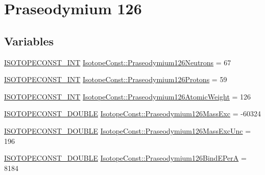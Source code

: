 \hypertarget{group___isotope_const-_praseodymium-_pr126}{}\section{Praseodymium 126}
\label{group___isotope_const-_praseodymium-_pr126}
\subsection*{Variables}
\begin{DoxyCompactItemize}
\item 
\mbox{\hyperlink{group___isotope_const-_macros_ga5f18360b3e99483a35c32d789e62621c}{I\+S\+O\+T\+O\+P\+E\+C\+O\+N\+S\+T\+\_\+\+I\+NT}} \mbox{\hyperlink{group___isotope_const-_praseodymium-_pr126_ga733e881bff9ec484a5390ee689631e96}{Isotope\+Const\+::\+Praseodymium126\+Neutrons}} = 67
\item 
\mbox{\hyperlink{group___isotope_const-_macros_ga5f18360b3e99483a35c32d789e62621c}{I\+S\+O\+T\+O\+P\+E\+C\+O\+N\+S\+T\+\_\+\+I\+NT}} \mbox{\hyperlink{group___isotope_const-_praseodymium-_pr126_ga6bcacd1d7615761c96ae7edb9a2ace0a}{Isotope\+Const\+::\+Praseodymium126\+Protons}} = 59
\item 
\mbox{\hyperlink{group___isotope_const-_macros_ga5f18360b3e99483a35c32d789e62621c}{I\+S\+O\+T\+O\+P\+E\+C\+O\+N\+S\+T\+\_\+\+I\+NT}} \mbox{\hyperlink{group___isotope_const-_praseodymium-_pr126_ga871e0690b037522643675a485f62c634}{Isotope\+Const\+::\+Praseodymium126\+Atomic\+Weight}} = 126
\item 
\mbox{\hyperlink{group___isotope_const-_macros_ga8f45a7272ce02c0b4c65c44636ed719a}{I\+S\+O\+T\+O\+P\+E\+C\+O\+N\+S\+T\+\_\+\+D\+O\+U\+B\+LE}} \mbox{\hyperlink{group___isotope_const-_praseodymium-_pr126_ga59c60e708bb0769179798750cf4da263}{Isotope\+Const\+::\+Praseodymium126\+Mass\+Exc}} = -\/60324
\item 
\mbox{\hyperlink{group___isotope_const-_macros_ga8f45a7272ce02c0b4c65c44636ed719a}{I\+S\+O\+T\+O\+P\+E\+C\+O\+N\+S\+T\+\_\+\+D\+O\+U\+B\+LE}} \mbox{\hyperlink{group___isotope_const-_praseodymium-_pr126_ga0bf9570897edf7e30af1196ad041febf}{Isotope\+Const\+::\+Praseodymium126\+Mass\+Exc\+Unc}} = 196
\item 
\mbox{\hyperlink{group___isotope_const-_macros_ga8f45a7272ce02c0b4c65c44636ed719a}{I\+S\+O\+T\+O\+P\+E\+C\+O\+N\+S\+T\+\_\+\+D\+O\+U\+B\+LE}} \mbox{\hyperlink{group___isotope_const-_praseodymium-_pr126_ga5a7b3df089be2f7a537bce32b7ddbdf7}{Isotope\+Const\+::\+Praseodymium126\+Bind\+E\+PerA}} = 8184

\end{DoxyCompactItemize}
